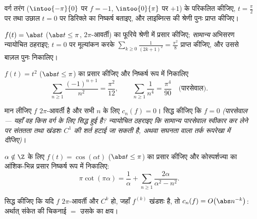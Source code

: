\begin{exercise}[$\star$]\label{exo:b2:fourier:1}
वर्ग तरंग ($\intoo{-\pi}{0}$ पर $f = -1$, $\intoo{0}{\pi}$ पर $+1$) के  परिकलित कीजिए, $t = \frac\pi2$
पर तथा उछाल $t = 0$ पर डिरिक्ले का निष्कर्ष बताइए, और लाइब्नित्स की श्रेणी
पुनः प्राप्त कीजिए।
\end{exercise}

\begin{exercise}[$\star$]\label{exo:b2:fourier:2}
$f(t) = \abs t$ ($\abs t \leq \pi$, $2\pi$-आवर्ती) का फूरिये श्रेणी में प्रसार कीजिए; \emph{सामान्य}
अभिसरण न्यायोचित ठहराइए; $t =
0$ पर मूल्यांकन करके $\sum_{k\geq0}\frac{1}{(2k+1)^2} = \frac{\pi^2}{8}$ प्राप्त कीजिए, और उससे
बाज़ल पुनः निकालिए।
\end{exercise}

\begin{exercise}[$\star$]\label{exo:b2:fourier:3}
$f(t) = t^2$ ($\abs t \leq \pi$) का प्रसार कीजिए और निष्कर्ष रूप में निकालिए
\[
\sum_{n\geq1}\frac{(-1)^{n+1}}{n^2} = \frac{\pi^2}{12},
\qquad
\sum_{n\geq1}\frac{1}{n^4} = \frac{\pi^4}{90}
\quad\text{(पारसेवाल)}.
\]
\end{exercise}

\begin{exercise}[$\star\star$]\label{exo:b2:fourier:4}
मान लीजिए $f$  $2\pi$-आवर्ती है और सभी $n$ के लिए $c_n(f) = 0$। सिद्ध कीजिए कि
$f = 0$ \emph{(पारसेवाल --- यहाँ वह किस वर्ग के लिए सिद्ध हुई है? न्यायोचित
ठहराइए कि सामान्य पारसेवाल स्वीकार कर लेने पर संततता तथा खंडशः $C^1$ की शर्त
हटाई जा सकती है, अथवा सघनता वाला तर्क रूपरेखा में दीजिए)}।
\end{exercise}

\begin{exercise}[$\star\star$]\label{exo:b2:fourier:5}
$\alpha \notin \Z$ के लिए $f(t) = \cos(\alpha t)$ ($\abs t
\leq \pi$) का प्रसार कीजिए और कोस्पर्शज्या का आंशिक-भिन्न प्रसार
निष्कर्ष रूप में निकालिए:
\[
\pi\cot(\pi\alpha) = \frac{1}{\alpha} + \sum_{n\geq1}
\frac{2\alpha}{\alpha^2 - n^2} .
\]
\end{exercise}

\begin{exercise}[$\star\star$]\label{exo:b2:fourier:6}
सिद्ध कीजिए कि यदि $f$ $2\pi$-आवर्ती और $C^k$ हो, जहाँ $f^{(k)}$ खंडशः  है, तो
$c_n(f) = O\bigl(\abs n^{-k}\bigr)$: अर्थात् संकेत की चिकनाई $=$ उसके  का क्षय।
\end{exercise}

